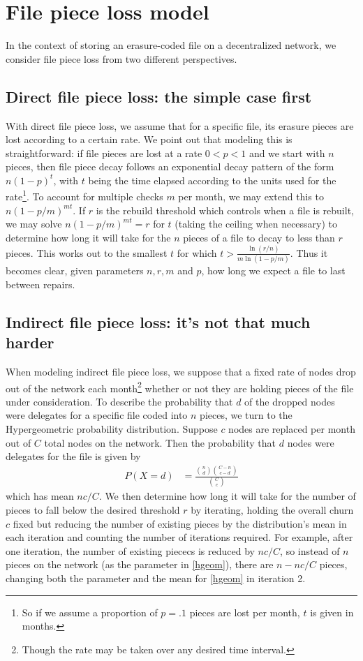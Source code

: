 \section{File piece loss model}
\linespread{2.0}

In the context of storing an erasure-coded file on a decentralized network, we consider file piece loss from two different perspectives.

\subsection{Direct file piece loss: the simple case first}
With direct file piece loss, we assume that for a specific file, its erasure pieces are lost according to a certain rate. We point out that modeling this is straightforward: if file pieces are lost at a rate $0<p<1$ and we start with $n$ pieces, then file piece decay follows an exponential decay pattern of the form $n(1-p)^t$, with $t$ being the time elapsed according to the units used for the rate\footnote{So if we assume a proportion of $p=.1$ pieces are lost per month, $t$ is given in months.}. 
To account for multiple checks $m$ per month, we may extend this to $n(1-p/m)^{mt}$. If $r$ is the rebuild threshold which controls when a file is rebuilt, we may solve $n(1-p/m)^{mt}=r$ for $t$ (taking the ceiling when necessary) to determine how long it will take for the $n$ pieces of a file to decay to less than $r$ pieces. This works out to the smallest $t$ for which
$t>\frac{\ln(r/n)}{m\ln(1-p/m)}$. Thus it becomes clear, given parameters $n,r,m$ and $p$, how long we expect a file to last between repairs.

\subsection{Indirect file piece loss: it's not that much harder}

When modeling indirect file piece loss, we suppose that a fixed rate of nodes drop out of the network each month\footnote{Though the rate may be taken over any desired time interval.} whether or not they are holding pieces of the file under consideration. To describe the probability that $d$ of the dropped nodes were delegates for a specific file coded into $n$ pieces, we turn to the Hypergeometric probability distribution. Suppose $c$ nodes are replaced per month out of $C$ total nodes on the network. Then the probability that $d$ nodes were delegates for the file is given by
\begin{align}
    P(X=d)&=\frac{\binom{n}{d}\binom{C-n}{c-d}}{\binom{C}{c}}\label{hgeom}
\end{align}
which has mean $nc/C$. We then determine how long it will take for the number of pieces to fall below the desired threshold $r$ by iterating, holding the overall churn $c$ fixed but reducing the number of existing pieces by the distribution's mean in each iteration and counting the number of iterations required. For example, after one iteration, the number of existing piececs is reduced by $nc/C$, so instead of $n$ pieces on the network (as the parameter in \eqref{hgeom}), there are $n-nc/C$ pieces, changing both the parameter and the mean for \eqref{hgeom} in iteration 2.

